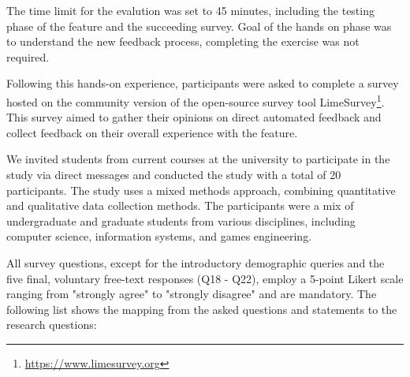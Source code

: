 \documentclass[manuscript,screen,review]{acmart}
\begin{document}
The time limit for the evalution was set to 45 minutes, including the testing phase of the feature and the succeeding survey.
Goal of the hands on phase was to understand the new feedback process, completing the exercise was not required.

Following this hands-on experience, participants were asked to complete a survey hosted on the community version of the open-source survey tool LimeSurvey\footnote{\url{https://www.limesurvey.org}}.
This survey aimed to gather their opinions on direct automated feedback and collect feedback on their overall experience with the feature.

We invited students from current courses at the university to participate in the study via direct messages and conducted the study with a total of 20 participants.
The study uses a mixed methods approach, combining quantitative and qualitative data collection methods. 
The participants were a mix of undergraduate and graduate students from various disciplines, including computer science, information systems, and games engineering.

All survey questions, except for the introductory demographic queries and the five final, voluntary free-text responses (Q18 - Q22), employ a 5-point Likert scale \cite{allen:2007:LikertScalesData} ranging from "strongly agree" to "strongly disagree" and are mandatory.
The following list shows the mapping from the asked questions and statements to the research questions:
\end{document}
